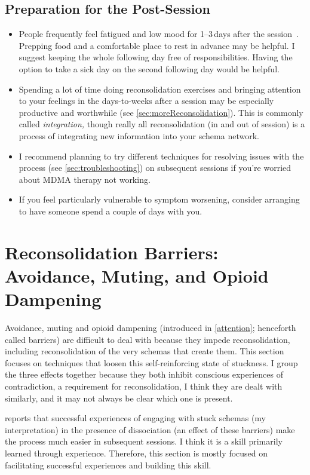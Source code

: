 \documentclass[11pt,oneside]{book}
\let\cite\parencite
\begin{document}
\subsection*{Preparation for the Post-Session}
\begin{itemize}
    \item People frequently feel fatigued and low mood for 1--3\,days after the session~\cite{liechtiGender}. Prepping food and a comfortable place to rest in advance may be helpful. I suggest keeping the whole following day free of responsibilities. Having the option to take a sick day on the second following day would be helpful.
    \item Spending a lot of time doing reconsolidation exercises and bringing attention to your feelings in the days-to-weeks after a session may be especially productive and worthwhile (see \cref{sec:moreReconsolidation}). This is commonly called \textit{integration,} though really all reconsolidation (in and out of session) is a process of integrating new information into your schema network.
    \item I recommend planning to try different techniques for resolving issues with the process (see \cref{sec:troubleshooting}) on subsequent sessions if you're worried about MDMA therapy not working.
    \item If you feel particularly vulnerable to symptom worsening, consider arranging to have someone spend a couple of days with you.
\end{itemize}

\section*{Reconsolidation Barriers: Avoidance, Muting, and Opioid Dampening}
\label{sec:sessionbarriers}
Avoidance, muting and opioid dampening (introduced in \cref{attention}; henceforth called barriers) are difficult to deal with because they impede reconsolidation, including reconsolidation of the very schemas that create them. This section focuses on techniques that loosen this self-reinforcing state of stuckness. I group the three effects together because they both inhibit conscious experiences of contradiction, a requirement for reconsolidation, I think they are dealt with similarly, and it may not always be clear which one is present.

\textcite{razviPSIP} reports that successful experiences of engaging with stuck schemas (my interpretation) in the presence of dissociation (an effect of these barriers) make the process much easier in subsequent sessions. I think it is a skill primarily learned through experience. Therefore, this section is mostly focused on facilitating successful experiences and building this skill.
\end{document}
